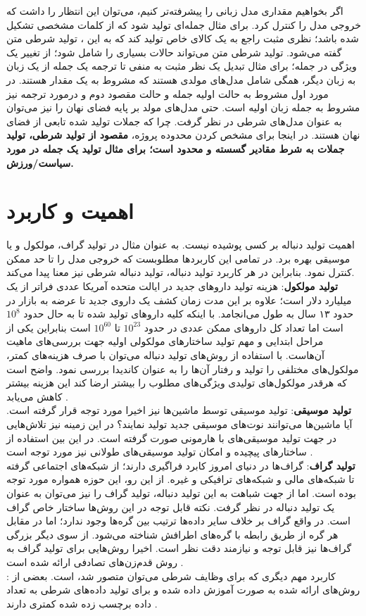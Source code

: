 اگر بخواهیم مقداری \task{} مدل زبانی را پیشرفته‌تر کنیم، می‌توان این انتظار را داشت که خروجی مدل را کنترل کرد. برای مثال جمله‌ای تولید شود که از کلمات مشخصی تشکیل شده باشد؛ نظری مثبت راجع به یک کالای خاص تولید کند که به این \task{}، تولید شرطی متن گفته می‌شود. تولید شرطی متن می‌تواند حالات بسیاری را شامل شود؛ از تغییر یک ویژگی در جمله؛ برای مثال تبدیل یک نظر مثبت به منفی تا ترجمه یک جمله از یک زبان به زبان دیگر، همگی شامل مدل‌های مولدی هستند که مشروط به یک مقدار هستند. در مورد اول مشروط به حالت اولیه جمله و حالت مقصود دوم و درمورد ترجمه نیز مشروط به جمله زبان اولیه است. حتی مدل‌های  مولد بر پایه فضای نهان را نیز می‌توان به عنوان مدل‌های شرطی در نظر گرفت. چرا که جملات تولید شده تابعی از فضای نهان هستند. در اینجا برای مشخص کردن محدوده پروژه، 
{\bf
    مقصود از تولید شرطی، تولید جملات به شرط مقادیر گسسته و محدود است؛ برای مثال تولید یک جمله در مورد سیاست/ورزش.}
\section{اهمیت و کاربرد}
اهمیت تولید دنباله بر کسی پوشیده نیست. به عنوان مثال در تولید گراف، مولکول و یا موسیقی بهره برد. در تمامی این کاربردها مطلوبست که خروجی مدل را تا حد ممکن کنترل نمود. بنابراین در هر کاربرد تولید دنباله، تولید دنباله شرطی نیز معنا پیدا می‌کند.
\\
{\bf تولید مولکول}:
هزینه تولید دارو‌های جدید در ایالت متحده آمریکا عددی فراتر از یک میلیارد دلار است؛ علاوه بر این مدت زمان کشف یک داروی جدید تا عرضه به بازار در حدود ۱۳ سال به طول می‌انجامد. با اینکه کلیه دارو‌های تولید شده تا به حال حدود $10^8$ است اما تعداد کل دارو‌های ممکن عددی در حدود $10^{23}$ تا $10^{60}$ است بنابراین یکی از مراحل ابتدایی و مهم تولید ساختارهای مولکولی اولیه جهت بررسی‌های ماهیت آن‌هاست. با استفاده از روش‌های تولید دنباله می‌توان با صرف هزینه‌های کمتر، مولکول‌های مختلفی را تولید و رفتار آن‌ها را به عنوان کاندیدا بررسی نمود. واضح است که هرقدر مولکول‌های تولیدی ویژگی‌های مطلوب را بیشتر ارضا کند این هزینه بیشتر کاهش می‌یابد \cite{molecule}.
\\
{\bf تولید موسیقی}:
تولید موسیقی توسط ماشین‌ها نیز اخیرا مورد توجه قرار گرفته است. آیا ماشین‌ها می‌توانند نوت‌های موسیقی جدید تولید نمایند؟ در این زمینه نیز تلاش‌هایی در جهت تولید موسیقی‌های با هارمونی صورت گرفته است. در این بین استفاده از ساختارهای پیچیده و امکان تولید موسیقی‌های طولانی نیز مورد توجه است \cite{vae_music, music}.
\\
{\bf تولید گراف}:
\task{}
گراف‌ها در دنیای امروز کابرد فراگیری دارند؛ از شبکه‌های اجتماعی گرفته تا شبکه‌های مالی و شبکه‌های ترافیکی و غیره. از این رو،‌ این حوزه همواره مورد توجه بوده است. اما از جهت شباهت به این تولید دنباله، تولید گراف را نیز می‌توان به عنوان یک \task{} تولید دنباله در نظر گرفت. نکته قابل توجه در این روش‌ها ساختار خاص گراف است. در واقع گراف بر خلاف سایر داده‌ها ترتیب بین گره‌ها وجود ندارد؛‌ اما در مقابل هر گره از طریق رابطه با گره‌های اطرافش شناخته می‌شود. از سوی دیگر بزرگی گراف‌ها نیز قابل توجه و نیازمند دقت نظر است. اخیرا روش‌هایی برای تولید گراف به روش قدم‌زن‌های تصادفی ارائه شده است \cite{deep_walk}.
\\
{\bf {}}:
کاربرد مهم دیگری که برای وظایف شرطی می‌توان متصور شد، \augmentation{} است. بعضی از روش‌های ارائه شده به صورت 
آموزش داده شده و برای تولید داده‌های شرطی به تعداد داده برچسب زده شده کمتری دارند \cite{cvae_semi}.
